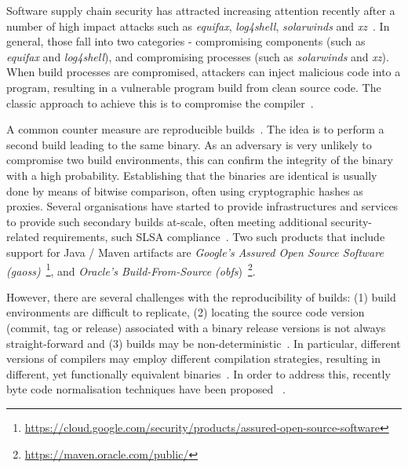 \documentclass[conference]{IEEEtran}
\begin{document}
Software supply chain security has attracted increasing attention recently after a number of high impact attacks such as \textit{equifax}, \textit{log4shell}, \textit{solarwinds} and \textit{xz}~\cite{ellison2010evaluating,martinez2021software,enck2022top,EO14028}. In general, those fall into two categories - compromising components (such as \textit{equifax} and \textit{log4shell}), and compromising processes (such as \textit{solarwinds} and \textit{xz}). When build processes are compromised, attackers can inject malicious code into a program, resulting in a vulnerable program build from clean source code. The classic approach to achieve this is to compromise the compiler~\cite{thompson1984reflections}. 

A common counter measure are reproducible builds~\cite{reproduciblebuild, lamb2021reproducible}. The idea is to perform a second build leading to the same binary. As an adversary is very unlikely to compromise two build environments, this can confirm the integrity of the binary with a high probability. Establishing that the binaries are identical is usually done by means of bitwise comparison, often using cryptographic hashes as proxies.
Several organisations have started to provide infrastructures and services to provide such secondary builds at-scale, often meeting additional security-related requirements, such  SLSA compliance~\cite{slsa}. Two such products that include support for Java / Maven artifacts are \textit{Google's Assured Open Source Software (gaoss)}~\footnote{\url{https://cloud.google.com/security/products/assured-open-source-software}}, and \textit{Oracle's Build-From-Source (obfs})~\footnote{\url{https://maven.oracle.com/public/}}.

However, there are several challenges with the reproducibility of builds: (1) build environments are difficult to replicate, (2) locating the source code version (commit, tag or release) associated with a binary release versions is not always straight-forward and (3) builds may be non-deterministic~\cite{xiong2022towards,hassanshahi2023macaron,bineqdataset,keshani2024aroma}. In particular, different versions of compilers may employ different compilation strategies, resulting in different, yet functionally equivalent binaries~\cite{xiong2022towards,bineqdataset,schott2024JNorm}.  
In order to address this, recently byte code normalisation techniques have been proposed ~\cite{xiong2022towards,dietrich2024levelsbinaryequivalencecomparison,schott2024JNorm}. 
\end{document}
